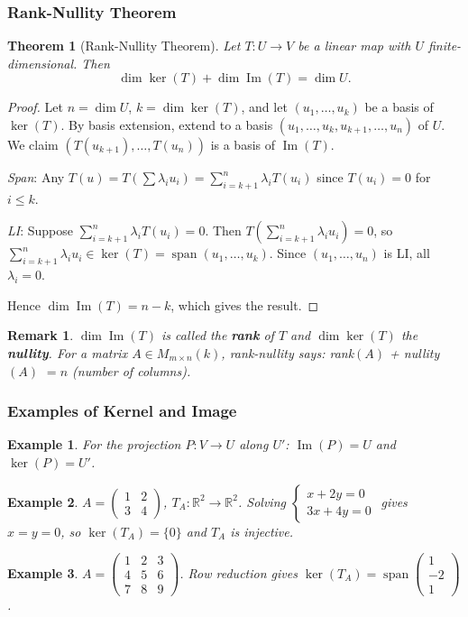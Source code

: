 \documentclass{article}
\newtheorem{theorem}{Theorem}
\newtheorem*{example}{Example}
\newtheorem{remark}{Remark}
\newcommand{\Span}{\operatorname{span}}
\begin{document}
\subsubsection{Rank-Nullity Theorem}
\begin{theorem}[Rank-Nullity Theorem]
    Let $T: U \to V$ be a linear map with $U$ finite-dimensional. Then
    \[\dim \ker(T) + \dim \operatorname{Im}(T) = \dim U.\]
\end{theorem}
\begin{proof}
    Let $n = \dim U$, $k = \dim \ker(T)$, and let $(u_1,\ldots,u_k)$ be a basis of $\ker(T)$. By basis extension, extend to a basis $(u_1,\ldots,u_k,u_{k+1},\ldots,u_n)$ of $U$. We claim $(T(u_{k+1}),\ldots,T(u_n))$ is a basis of $\operatorname{Im}(T)$.

    \textit{Span}: Any $T(u) = T(\sum\lambda_i u_i) = \sum_{i=k+1}^n \lambda_i T(u_i)$ since $T(u_i)=0$ for $i\le k$.

    \textit{LI}: Suppose $\sum_{i=k+1}^n \lambda_i T(u_i) = 0$. Then $T\!\left(\sum_{i=k+1}^n \lambda_i u_i\right) = 0$, so $\sum_{i=k+1}^n \lambda_i u_i \in \ker(T) = \Span(u_1,\ldots,u_k)$. Since $(u_1,\ldots,u_n)$ is LI, all $\lambda_i = 0$.

    Hence $\dim\operatorname{Im}(T) = n - k$, which gives the result.
\end{proof}
\begin{remark}
    $\dim\operatorname{Im}(T)$ is called the \textbf{rank} of $T$ and $\dim\ker(T)$ the \textbf{nullity}. For a matrix $A\in M_{m\times n}(k)$, rank-nullity says: rank$(A)$ + nullity$(A)$ $= n$ (number of columns).
\end{remark}

\subsubsection{Examples of Kernel and Image}
\begin{example}
    For the projection $P: V\to U$ along $U'$: $\operatorname{Im}(P)=U$ and $\ker(P)=U'$.
\end{example}
\begin{example}
    $A=\begin{pmatrix}1&2\\3&4\end{pmatrix}$, $T_A:\mathbb{R}^2\to\mathbb{R}^2$. Solving $\begin{cases}x+2y=0\\3x+4y=0\end{cases}$ gives $x=y=0$, so $\ker(T_A)=\{0\}$ and $T_A$ is injective.
\end{example}
\begin{example}
    $A=\begin{pmatrix}1&2&3\\4&5&6\\7&8&9\end{pmatrix}$. Row reduction gives $\ker(T_A)=\Span\begin{pmatrix}1\\-2\\1\end{pmatrix}$.
\end{example}
\end{document}
